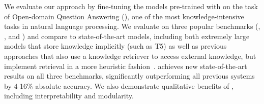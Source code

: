 We evaluate our approach by fine-tuning the models pre-trained with \thename on the task of Open-domain Question Answering (\openqa), one of the most knowledge-intensive tasks in natural language processing.
%
We evaluate on three popular \openqa benchmarks (\nq, \wq, and \trec) and compare to state-of-the-art \openqa models, including both extremely large models that store knowledge implicitly (such as T5) as well as previous approaches that also use a knowledge retriever to access external knowledge, but implement retrieval in a more heuristic fashion~\cite{orqa,openqa_hardem,rrp_salesforce}. \thename achieves new state-of-the-art results on all three benchmarks, significantly outperforming all previous systems by 4-16\% absolute accuracy. We also demonstrate qualitative benefits of \thename, including interpretability and modularity.

